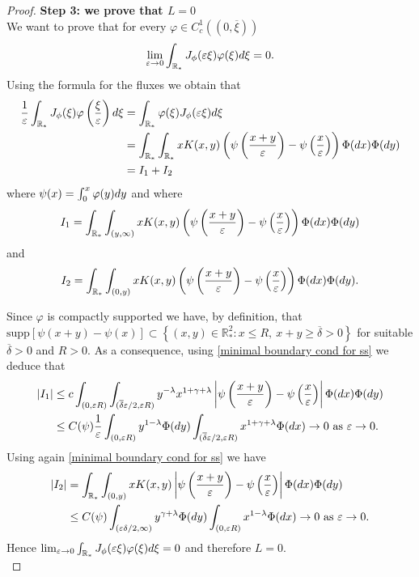 \documentclass[11pt]{article}
\numberwithin{equation}{section}
\newcommand{\supp}{\mbox{supp}}
\theoremstyle{plain}
\newcommand{\der}{\textup{d}}
\begin{document}
\begin{proof}
\textbf{Step 3: we prove that $L=0$} \\

We want to prove that for every $\varphi \in C^1_c((0, \overline \xi))$
\[
\lim_{\varepsilon \rightarrow 0 } \int_{\mathbb R_*} J_{\phi}(\varepsilon \xi)  \varphi(\xi) \der \xi =0. 
\]
Using the formula for the fluxes we obtain that 
\begin{align*}
 \frac{1}{\varepsilon}  \int_{\mathbb R_*} J_{\phi}( \xi)  \varphi\left(\frac{\xi}{\varepsilon}\right) \der \xi &= \int_{\mathbb R_*}  \varphi(\xi)  J_{\phi}(\varepsilon \xi) \der \xi 
\\
&= \int_{\mathbb R_*}  \int_{\mathbb R_*} x K(x,y) \left( \psi\left(\frac{x+y}{\varepsilon}\right) - \psi\left(\frac{x}{\varepsilon}\right) \right) \Phi (\der x )  \Phi( \der y )\\
&=I_1 + I_2
\end{align*}
where $\psi(x)= \int_0^x \varphi(y) \der y$
and where 
\[
I_1 = \int_{\mathbb R_*}  \int_{(y,\infty)} x K(x,y) \left( \psi\left(\frac{x+y}{\varepsilon}\right) - \psi\left(\frac{x}{\varepsilon}\right) \right) \Phi (\der x )  \Phi( \der y )
\]
and
\[
I_2 = \int_{\mathbb R_*}  \int_{(0, y)} x K(x,y) \left( \psi\left(\frac{x+y}{\varepsilon}\right) - \psi\left(\frac{x}{\varepsilon}\right)\right) \Phi (\der x )  \Phi( \der y ).
\]

Since $\varphi$ is compactly supported we have, by definition, that $ \supp \left[ \psi\left(x+y\right) - \psi\left(x\right) \right] \subset \left\{ (x,y) \in \mathbb R_*^2 : x \leq  R , \ x+y \geq \overline \delta >0 \right\} $
for suitable $\overline \delta >0$ and $R>0.$
As a consequence, using \eqref{minimal boundary cond for ss} we deduce that 
\begin{align*}
 |I_1 | & \leq c\int_{(0, \varepsilon R)} \int_{(\overline \delta\varepsilon/2, \varepsilon R)} y^{-\lambda} x^{1+\gamma+\lambda } \left| \psi\left(\frac{x+y}{\varepsilon}\right) - \psi\left(\frac{x}{\varepsilon}\right) \right| \Phi(\der x) \Phi(\der y) \\
&\leq C(\psi) \frac{1}{\varepsilon}
 \int_{(0, \varepsilon R)} y^{1-\lambda} \Phi(\der y) \int_{(\overline \delta\varepsilon/2, \varepsilon R)}x^{1+\gamma+\lambda } \Phi(\der x) \rightarrow 0 \text{ as } \varepsilon \rightarrow 0.
\end{align*} 
Using again \eqref{minimal boundary cond for ss} we have
\begin{align*}
    | I_2 |& =   \int_{\mathbb R_*}  \int_{(0,y )} x K(x,y) \left| \psi\left(\frac{x+y}{\varepsilon}\right) - \psi\left(\frac{x}{\varepsilon}\right)\right| \Phi (\der x )  \Phi( \der y ) \\
    &\leq C(\psi) \int_{(\varepsilon\delta/2, \infty)} y^{\gamma+\lambda} \Phi( \der y )  \int_{(0, \varepsilon R)} x^{1-\lambda}  \Phi (\der x ) \rightarrow 0 \text{ as } \varepsilon \rightarrow 0. 
\end{align*}
Hence $
\lim_{\varepsilon \rightarrow 0 } \int_{\mathbb R_*} J_{\phi}(\varepsilon \xi)  \varphi(\xi) \der \xi =0$ and therefore $L=0.$\\


\end{proof}
\end{document}
